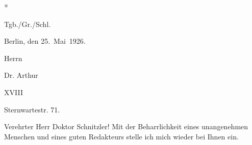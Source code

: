 \pstart
           \centering{}\textcolor{gray}{\textbf{*}}\pend
           
\pstart
           Tgb./Gr./Schl.\pend
           
\pstart
           \raggedleft{}Berlin, den
                  25. Mai 1926.\pend
           
\pstart
           \raggedleft{}Herrn\pend
           
\pstart
           \raggedleft{}Dr. Arthur \pend
           
\pstart
           \raggedleft{} XVIII\pend
           
\pstart
           \raggedleft{}Sternwartestr. 71.\pend
           
\pstart\center{}Verehrter Herr Doktor Schnitzler!\pend\vspace{0.5em}
\pstart
           Mit der Beharrlichkeit eines unangenehmen Menschen und eines guten Redakteurs stelle
               ich mich wieder bei Ihnen ein.\pend
           
